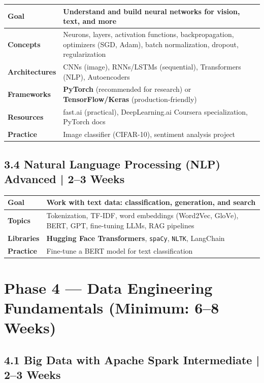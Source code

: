 \documentclass[a4paper,11pt]{article}
\begin{document}
\begin{tabular}{>{\bfseries}p{3cm} p{11.5cm}}
\toprule
Goal & Understand and build neural networks for vision, text, and more \\
\midrule
Concepts & Neurons, layers, activation functions, backpropagation, optimizers (SGD, Adam), batch normalization, dropout, regularization \\
Architectures & CNNs (image), RNNs/LSTMs (sequential), Transformers (NLP), Autoencoders \\
Frameworks & \textbf{PyTorch} (recommended for research) or \textbf{TensorFlow/Keras} (production-friendly) \\
Resources & fast.ai (practical), DeepLearning.ai Coursera specialization, PyTorch docs \\
Practice & Image classifier (CIFAR-10), sentiment analysis project \\
\bottomrule
\end{tabular}

\subsection{3.4 Natural Language Processing (NLP) \hfill \small\normalfont\color{darkgray}Advanced | 2--3 Weeks}

\begin{tabular}{>{\bfseries}p{3cm} p{11.5cm}}
\toprule
Goal & Work with text data: classification, generation, and search \\
\midrule
Topics & Tokenization, TF-IDF, word embeddings (Word2Vec, GloVe), BERT, GPT, fine-tuning LLMs, RAG pipelines \\
Libraries & \textbf{Hugging Face Transformers}, \texttt{spaCy}, \texttt{NLTK}, LangChain \\
Practice & Fine-tune a BERT model for text classification \\
\bottomrule
\end{tabular}

\section{Phase 4 — Data Engineering Fundamentals \hfill \small\normalfont\color{teal}(Minimum: 6--8 Weeks)}

\subsection{4.1 Big Data with Apache Spark \hfill \small\normalfont\color{darkgray}Intermediate | 2--3 Weeks}
\end{document}
